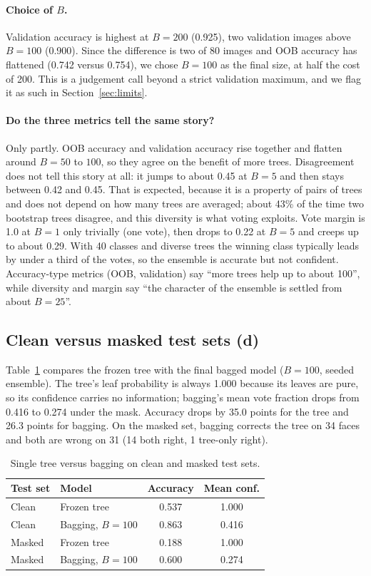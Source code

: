 \documentclass[10pt,twocolumn,letterpaper]{article}
\begin{document}
\paragraph{Choice of $B$.}
Validation accuracy is highest at $B{=}200$ (0.925), two validation images above $B{=}100$ (0.900). Since the difference is two of 80 images and OOB accuracy has flattened (0.742 versus 0.754), we chose $B{=}100$ as the final size, at half the cost of 200. This is a judgement call beyond a strict validation maximum, and we flag it as such in Section~\ref{sec:limits}.

\paragraph{Do the three metrics tell the same story?}
Only partly. OOB accuracy and validation accuracy rise together and flatten around $B{=}50$ to $100$, so they agree on the benefit of more trees. Disagreement does not tell this story at all: it jumps to about 0.45 at $B{=}5$ and then stays between 0.42 and 0.45. That is expected, because it is a property of pairs of trees and does not depend on how many trees are averaged; about 43\% of the time two bootstrap trees disagree, and this diversity is what voting exploits. Vote margin is 1.0 at $B{=}1$ only trivially (one vote), then drops to 0.22 at $B{=}5$ and creeps up to about 0.29. With 40 classes and diverse trees the winning class typically leads by under a third of the votes, so the ensemble is accurate but not confident. Accuracy-type metrics (OOB, validation) say ``more trees help up to about 100'', while diversity and margin say ``the character of the ensemble is settled from about $B{=}25$''.

\subsection{Clean versus masked test sets (d)}
Table~\ref{tab:q1d} compares the frozen tree with the final bagged model ($B{=}100$, seeded ensemble). The tree's leaf probability is always 1.000 because its leaves are pure, so its confidence carries no information; bagging's mean vote fraction drops from 0.416 to 0.274 under the mask. Accuracy drops by 35.0 points for the tree and 26.3 points for bagging. On the masked set, bagging corrects the tree on 34 faces and both are wrong on 31 (14 both right, 1 tree-only right).

\begin{table}[t]
\centering\small
\begin{tabular}{@{}llcc@{}}
\toprule
Test set & Model & Accuracy & Mean conf.\\
\midrule
Clean & Frozen tree & 0.537 & 1.000\\
Clean & Bagging, $B{=}100$ & 0.863 & 0.416\\
Masked & Frozen tree & 0.188 & 1.000\\
Masked & Bagging, $B{=}100$ & 0.600 & 0.274\\
\bottomrule
\end{tabular}
\caption{Single tree versus bagging on clean and masked test sets.}
\label{tab:q1d}
\end{table}
\end{document}

